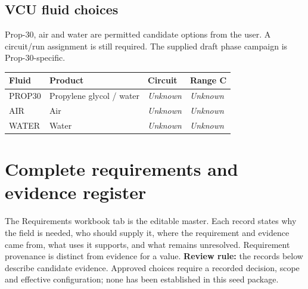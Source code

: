 \documentclass[11pt]{article}
\begin{document}
\subsection*{VCU fluid choices}
Prop-30, air and water are permitted candidate options from the user. A circuit/run assignment is still required. The supplied draft phase campaign is Prop-30-specific.
\small\setlength{\tabcolsep}{4pt}
\begin{longtable}{p{}p{}p{}p{}}
\toprule
\textbf{Fluid} & \textbf{Product} & \textbf{Circuit} & \textbf{Range C} \\\midrule\endhead
PROP30 & Propylene glycol / water & \textit{Unknown} & \textit{Unknown} \\[3pt]
AIR & Air & \textit{Unknown} & \textit{Unknown} \\[3pt]
WATER & Water & \textit{Unknown} & \textit{Unknown} \\[3pt]
\bottomrule\end{longtable}\normalsize
\appendix
\clearpage\section{Complete requirements and evidence register}\label{requirements}
The Requirements workbook tab is the editable master. Each record states why the field is needed, who should supply it, where the requirement and evidence came from, what uses it supports, and what remains unresolved. Requirement provenance is distinct from evidence for a value.
\textbf{Review rule:} the records below describe candidate evidence. Approved choices require a recorded decision, scope and effective configuration; none has been established in this seed package.
\end{document}
